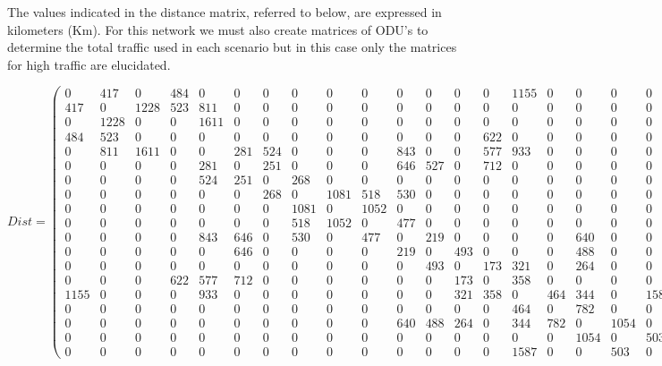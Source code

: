 The values indicated in the distance matrix, referred to below, are expressed in kilometers (Km).
For this network we must also create matrices of ODU's to determine the total traffic used in each scenario  but in this case only the matrices for high traffic are elucidated.


\begin{sidewaysfigure}

\[
Dist=
  \begin{pmatrix}
    0 & 417 & 0 & 484 & 0 & 0 & 0 & 0 & 0 & 0 & 0 & 0 & 0 & 0 & 1155 & 0 & 0 & 0 & 0 \\
    417 & 0 & 1228 & 523 & 811 & 0 & 0 & 0 & 0 & 0 & 0 & 0 & 0 & 0 & 0 & 0 & 0 & 0 & 0 \\
    0 & 1228 & 0 & 0 & 1611 & 0 & 0 & 0 & 0 & 0 & 0 & 0 & 0 & 0 & 0 & 0 & 0 & 0 & 0 \\
    484 & 523 & 0 & 0 & 0 & 0 & 0 & 0 & 0 & 0 & 0 & 0 & 0 & 622 & 0 & 0 & 0 & 0 & 0 \\
    0 & 811 & 1611 & 0 & 0 & 281 & 524 & 0 & 0 & 0 & 843 & 0 & 0 & 577 & 933 & 0 & 0 & 0 & 0 \\
    0 & 0 & 0 & 0 & 281 & 0 & 251 & 0 & 0 & 0 & 646 & 527 & 0 & 712 & 0 & 0 & 0 & 0 & 0 \\
    0 & 0 & 0 & 0 & 524 & 251 & 0 & 268 & 0 & 0 & 0 & 0 & 0 & 0 & 0 & 0 & 0 & 0 & 0 \\
    0 & 0 & 0 & 0 & 0 & 0 & 268 & 0 & 1081 & 518 & 530 & 0 & 0 & 0 & 0 & 0 & 0 & 0 & 0 \\
    0 & 0 & 0 & 0 & 0 & 0 & 0 & 1081 & 0 & 1052 & 0 & 0 & 0 & 0 & 0 & 0 & 0 & 0 & 0 \\
    0 & 0 & 0 & 0 & 0 & 0 & 0 & 518 & 1052 & 0 & 477 & 0 & 0 & 0 & 0 & 0 & 0 & 0 & 0 \\
    0 & 0 & 0 & 0 & 843 & 646 & 0 & 530 & 0 & 477 & 0 & 219 & 0 & 0 & 0 & 0 & 640 & 0 & 0 \\
    0 & 0 & 0 & 0 & 0 & 646 & 0 & 0 & 0 & 0 & 219 & 0 & 493 & 0 & 0 & 0 & 488 & 0 & 0 \\
    0 & 0 & 0 & 0 & 0 & 0 & 0 & 0 & 0 & 0 & 0 & 493 & 0 & 173 & 321 & 0 & 264 & 0 & 0 \\
    0 & 0 & 0 & 622 & 577 & 712 & 0 & 0 & 0 & 0 & 0 & 0 & 173 & 0 & 358 & 0 & 0 & 0 & 0 \\
    1155 & 0 & 0 & 0 & 933 & 0 & 0 & 0 & 0 & 0 & 0 & 0 & 321 & 358 & 0 & 464 & 344 & 0 & 1587 \\
    0 & 0 & 0 & 0 & 0 & 0 & 0 & 0 & 0 & 0 & 0 & 0 & 0 & 0 & 464 & 0 & 782 & 0 & 0 \\
    0 & 0 & 0 & 0 & 0 & 0 & 0 & 0 & 0 & 0 & 640 & 488 & 264 & 0 & 344 & 782 & 0 & 1054 & 0 \\
    0 & 0 & 0 & 0 & 0 & 0 & 0 & 0 & 0 & 0 & 0 & 0 & 0 & 0 & 0 & 0 & 1054 & 0 & 503 \\
    0 & 0 & 0 & 0 & 0 & 0 & 0 & 0 & 0 & 0 & 0 & 0 & 0 & 0 & 1587 & 0 & 0 & 503 & 0
  \end{pmatrix}
\]
\end{sidewaysfigure}


